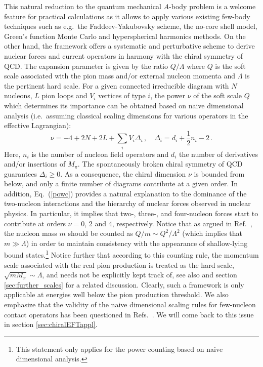 \documentclass[aps,rmp,nofootinbib,twocolumn,floatfix]{revtex4}
\newcommand{\beq}{\begin{equation}}
\newcommand{\eeq}{\end{equation}}
\begin{document}
This natural reduction to the quantum mechanical $A$-body
problem is a welcome feature for practical calculations as it allows to apply various existing few-body
techniques such as e.g.~the Faddeev-Yakubovsky scheme, the no-core shell
model, Green's function Monte Carlo and hyperspherical harmonics methods. On
the other hand, the framework offers a systematic and perturbative scheme to
derive nuclear forces and current operators in harmony with the chiral symmetry of QCD. 
The expansion parameter is given by the ratio $Q/\Lambda$ where $Q$ is the
soft scale associated with the pion mass and/or external nucleon momenta and
$\Lambda$ is the pertinent hard scale.  
For a given connected irreducible diagram with
$N$ nucleons, $L$ pion loops and $V_i$ vertices of 
type $i$, the  power $\nu$ of the soft scale $Q$  which
determines its importance can be obtained based on naive dimensional
analysis (i.e.~assuming classical scaling dimensions for various operators
in the effective Lagrangian):
\beq
\label{powc}
\nu = -4 + 2 N + 2 L + \sum_i V_i \Delta_i\,, 
 \quad \Delta_i = d_i + \frac{1}{2} n_i - 2\,.
\eeq
Here, $n_i$ is the number of nucleon field operators and $d_i$ the  
number of derivatives and/or insertions of $M_\pi$. The spontaneously broken
chiral symmetry of QCD guarantees $\Delta_i \geq 0$. As a consequence, the
chiral dimension $\nu$ is bounded from below, and only a finite number of diagrams
contribute at a given order. In addition, Eq.~(\ref{powc}) provides a natural
explanation to 
the dominance of the two-nucleon interactions and the hierarchy of nuclear
forces observed in nuclear physics. In particular, it implies that two-,
three-, and four-nucleon forces start to contribute at orders $\nu = 0$, $2$
and $4$, respectively. Notice that as argued in Ref.~\cite{Weinberg:1991um},
the nucleon mass $m$ should be counted as $Q/m \sim Q^2/\Lambda^2$ 
(which implies that $m \gg \Lambda$) 
in order to maintain consistency with the appearance of shallow-lying
bound states.\footnote{This statement only applies for the power 
counting based on
naive dimensional analysis.} Notice further that
according to this counting rule, the momentum
scale associated with the real pion production is treated as
the hard scale, $\sqrt{m M_\pi} \sim \Lambda$, and
needs not be explicitly kept track of, see also \cite{Mondejar:2006yu}
and section \ref{sec:further_scales} for a related discussion. Clearly, such a framework is
only applicable at energies well below the pion
production threshold. We also emphasize that the validity of the naive
dimensional scaling rules for few-nucleon contact operators has been
questioned in Refs.~\cite{Nogga:2005hy,Birse:2005um}. We will come back
to this issue in section \ref{sec:chiralEFTappl}.  
\end{document}
